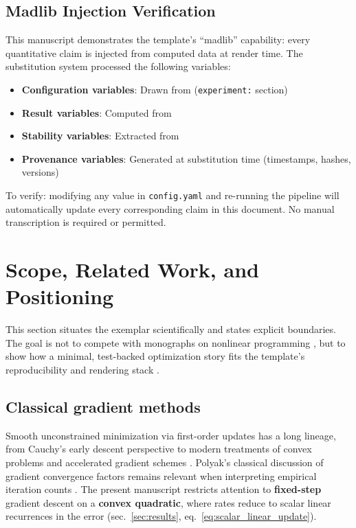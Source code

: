 \documentclass[
  english,
]{article}
\providecommand{\tightlist}{%
  \setlength{\itemsep}{0pt}\setlength{\parskip}{0pt}}
\begin{document}
\subsection{Madlib Injection
Verification}\label{madlib-injection-verification}

This manuscript demonstrates the template's ``madlib'' capability: every
quantitative claim is injected from computed data at render time. The
substitution system processed the following variables:

\begin{itemize}
\tightlist
\item
  \textbf{Configuration variables}: Drawn from
   (\texttt{experiment:} section)
\item
  \textbf{Result variables}: Computed from
\item
  \textbf{Stability variables}: Extracted from
\item
  \textbf{Provenance variables}: Generated at substitution time
  (timestamps, hashes, versions)
\end{itemize}

To verify: modifying any value in \texttt{config.yaml} and re-running
the pipeline will automatically update every corresponding claim in this
document. No manual transcription is required or permitted.

\newpage

\section{Scope, Related Work, and Positioning}\label{sec:scope}

This section situates the exemplar scientifically and states explicit
boundaries. The goal is not to compete with monographs on nonlinear
programming \citep{nocedal2006numerical, bertsekas1999nonlinear}, but to
show how a minimal, test-backed optimization story fits the template's
reproducibility and rendering stack \citep{peng2011reproducible}.

\subsection{Classical gradient
methods}\label{classical-gradient-methods}

Smooth unconstrained minimization via first-order updates has a long
lineage, from Cauchy's early descent perspective
\citep{cauchy1847methode} to modern treatments of convex problems
\citep{boyd2004convex} and accelerated gradient schemes
\citep{nesterov2013gradient}. Polyak's classical discussion of gradient
convergence factors remains relevant when interpreting empirical
iteration counts \citep{polyak1964some}. The present manuscript
restricts attention to \textbf{fixed-step} gradient descent on a
\textbf{convex quadratic}, where rates reduce to scalar linear
recurrences in the error (sec.~\ref{sec:results},
eq.~\ref{eq:scalar_linear_update}).
\end{document}

